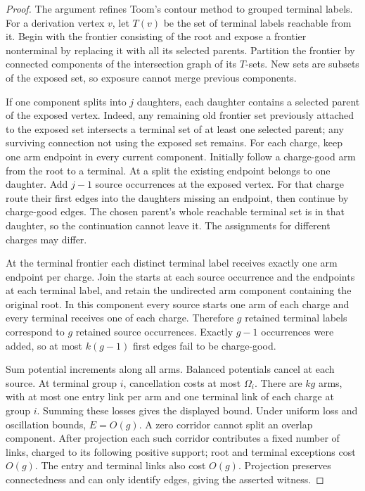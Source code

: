 \begin{proof}
The argument refines Toom's contour method
\cite{BermanSimon1988,Gacs2001,Toom1980} to grouped terminal labels.
For a derivation vertex \(v\), let \(T(v)\) be the set of terminal
labels reachable from it. Begin with the frontier consisting of the
root and expose a frontier nonterminal by replacing it with all its
selected parents. Partition the frontier by connected components of
the intersection graph of its \(T\)-sets. New sets are subsets of the
exposed set, so exposure cannot merge previous components.

If one component splits into \(j\) daughters, each daughter contains
a selected parent of the exposed vertex. Indeed, any remaining old
frontier set previously attached to the exposed set intersects a
terminal set of at least one selected parent; any surviving connection
not using the exposed set remains. For each charge, keep one arm
endpoint in every current component. Initially follow a charge-good
arm from the root to a terminal. At a split the existing endpoint
belongs to one daughter. Add \(j-1\) source occurrences at the exposed
vertex. For that charge route their first edges into the daughters
missing an endpoint, then continue by charge-good edges. The chosen
parent's whole reachable terminal set is in that daughter, so the
continuation cannot leave it. The assignments for different charges
may differ.

At the terminal frontier each distinct terminal label receives
exactly one arm endpoint per charge. Join the starts at each source
occurrence and the endpoints at each terminal label, and retain the
undirected arm component containing the original root. In this
component every source starts one arm of each charge and every
terminal receives one of each charge. Therefore \(g\) retained
terminal labels correspond to \(g\) retained source occurrences.
Exactly \(g-1\) occurrences were added, so at most \(k(g-1)\) first
edges fail to be charge-good.

Sum potential increments along all arms. Balanced potentials cancel
at each source. At terminal group \(i\), cancellation costs at most
\(\Omega_i\). There are \(kg\) arms, with at most one entry link per arm
and one terminal link of each charge at group \(i\). Summing these
losses gives the displayed bound. Under uniform loss and oscillation
bounds, \(E=O(g)\). A zero corridor cannot split an overlap component. After
projection each such corridor contributes a fixed number of links,
charged to its following positive support; root and terminal
exceptions cost \(O(g)\). The entry and terminal links also cost
\(O(g)\). Projection preserves connectedness and can only identify
edges, giving the asserted witness.
\end{proof}

